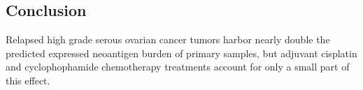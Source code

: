 \subsection*{Conclusion}
Relapsed high grade serous ovarian cancer tumors harbor nearly double the predicted expressed neoantigen burden of primary samples, but adjuvant cisplatin and cyclophophamide chemotherapy treatments account for only a small part of this effect.







